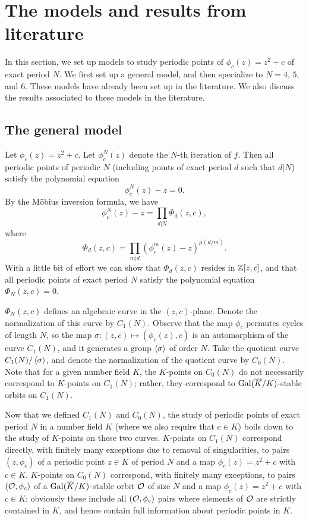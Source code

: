 \section{The models and results from literature}
\label{sec:model}

In this section, we set up models to study periodic points of
$\phi_c(z) = z^2 + c$ of exact period $N$. We first set up a general
model, and then specialize to $N = 4$, $5$, and $6$. These models have
already been set up in the literature. We also discuss the results
associated to these models in the literature.

\subsection{The general model}
\label{subsec:model-general}

Let $\phi_c(z) = z^2 + c$. Let $\phi_c^N(z)$ denote the $N$-th
iteration of $f$. Then all periodic points of periodic $N$ (including
points of exact period $d$ such that $d | N$) satisfy the polynomial
equation
\[
\phi_c^N(z) - z = 0.
\]
By the M\"obius inversion formula, we have
\[
\phi_c^N(z) - z = \prod_{d|N} \Phi_d(z, c),
\]
where
\[
\Phi_d(z, c) = \prod_{m|d}(\phi_c^m(z) - z)^{\mu(d/m)}.
\]
With a little bit of effort we can show that $\Phi_d(z, c)$ resides in
$\mathbb{Z}[z, c]$, and that all periodic points of exact period $N$ satisfy
the polynomial equation $\Phi_N(z, c) = 0$.

$\Phi_N(z, c)$ defines an algebraic curve in the $(z,
c)$-plane. Denote the normalization of this curve by $C_1(N)$. Observe
that the map $\phi_c$ permutes cycles of length $N$, so the map
$\sigma: (z, c) \mapsto (\phi_c(z), c)$ is an automorphism of the
curve $C_1(N)$, and it generates a group $\left<\sigma\right>$ of order
$N$. Take the quotient curve $C_1(N)/\left<\sigma\right>$, and denote the
normalization of the quotient curve by $C_0(N)$. Note that for a given
number field $K$, the $K$-points on $C_0(N)$ do not necessarily
correspond to $K$-points on $C_1(N)$; rather, they correspond to
$\mathrm{Gal}(\overline{K}/K)$-stable orbits on $C_1(N)$.

Now that we defined $C_1(N)$ and $C_0(N)$, the study of periodic
points of exact period $N$ in a number field $K$ (where we also
require that $c \in K$) boils down to the study of $K$-points on these
two curves. $K$-points on $C_1(N)$ correspond directly, with finitely
many exceptions due to removal of singularities, to pairs $(z,
\phi_c)$ of a periodic point $z \in K$ of period $N$ and a map
$\phi_c(z) = z^2 + c$ with $c \in K$. $K$-points on $C_0(N)$
correspond, with finitely many exceptions, to pairs $(\mathcal{O}, \phi_c)$ of
a $\mathrm{Gal}(\overline{K}/K)$-stable orbit $\mathcal{O}$ of size $N$ and a map $\phi_c(z)
= z^2 + c$ with $c \in K$; obviously these include all $(\mathcal{O}, \phi_c)$
pairs where elements of $\mathcal{O}$ are strictly contained in $K$, and hence
contain full information about periodic points in $K$.

